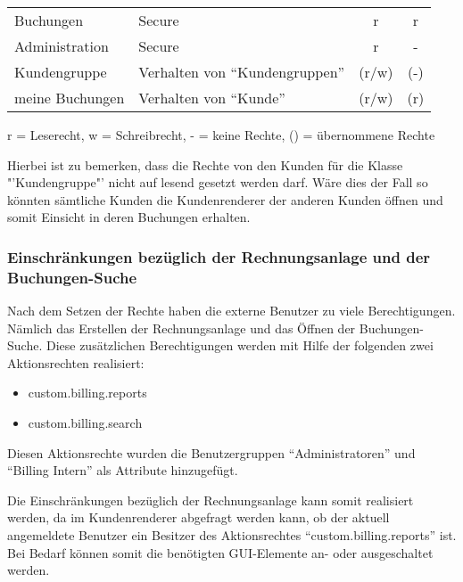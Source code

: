 \begin{minipage}{\linewidth}
\centering
{} \label{tab:katalogrechte}
\begin{tabulary}{\textwidth}{|l|L|C|c|}
 \hline 
  &  &  &  \tabularnewline
 \hline 
 Buchungen & Secure & r & r \\ 
 \hline 
 Administration & Secure &r & - \\ 
 \hline 
 Kundengruppe & Verhalten von "`Kundengruppen"' & (r/w) & (-) \\ 
 \hline 
 meine Buchungen & Verhalten von "`Kunde"' & (r/w) & (r) \\ 
 \hline 
 \end{tabulary}
 \par
 \bigskip
 r = Leserecht, w = Schreibrecht, - = keine Rechte, () = übernommene Rechte
 \end{minipage}
 
Hierbei ist zu bemerken, dass die Rechte von den Kunden für die Klasse "'Kundengruppe"' nicht auf lesend gesetzt werden darf. Wäre dies der Fall so könnten sämtliche Kunden die Kundenrenderer der anderen Kunden öffnen und somit Einsicht in deren Buchungen erhalten.

\subsubsection{Einschränkungen bezüglich der Rechnungsanlage und der Buchungen-Suche}

Nach dem Setzen der Rechte haben die externe Benutzer zu viele Berechtigungen.
Nämlich das Erstellen der Rechnungsanlage und das Öffnen der Buchungen-Suche.
Diese zusätzlichen Berechtigungen werden mit Hilfe der folgenden zwei Aktionsrechten realisiert:
\begin{itemize}
\item custom.billing.reports
\item custom.billing.search
\end{itemize}
Diesen Aktionsrechte wurden die Benutzergruppen "`Administratoren"' und "`Billing Intern"' als Attribute hinzugefügt.

Die Einschränkungen bezüglich der Rechnungsanlage kann somit realisiert werden, da  im Kundenrenderer abgefragt werden kann, ob der aktuell angemeldete Benutzer ein Besitzer des Aktionsrechtes "`custom.billing.reports"' ist.
Bei Bedarf können somit die benötigten GUI-Elemente an- oder ausgeschaltet werden.

